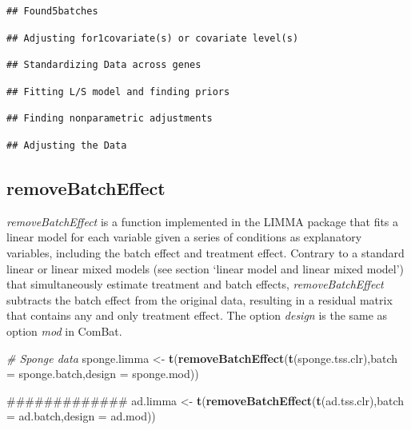 \documentclass[]{book}
\newenvironment{Shaded}{\begin{snugshade}}{\end{snugshade}}
\newcommand{\KeywordTok}[1]{\textcolor[rgb]{0.13,0.29,0.53}{\textbf{#1}}}
\newcommand{\DataTypeTok}[1]{\textcolor[rgb]{0.13,0.29,0.53}{#1}}
\newcommand{\StringTok}[1]{\textcolor[rgb]{0.31,0.60,0.02}{#1}}
\newcommand{\CommentTok}[1]{\textcolor[rgb]{0.56,0.35,0.01}{\textit{#1}}}
\newcommand{\NormalTok}[1]{#1}
\begin{document}
\begin{verbatim}
## Found5batches
\end{verbatim}

\begin{verbatim}
## Adjusting for1covariate(s) or covariate level(s)
\end{verbatim}

\begin{verbatim}
## Standardizing Data across genes
\end{verbatim}

\begin{verbatim}
## Fitting L/S model and finding priors
\end{verbatim}

\begin{verbatim}
## Finding nonparametric adjustments
\end{verbatim}

\begin{verbatim}
## Adjusting the Data
\end{verbatim}

\subsection{removeBatchEffect}\label{removebatcheffect}

\emph{removeBatchEffect} is a function implemented in the LIMMA package
that fits a linear model for each variable given a series of conditions
as explanatory variables, including the batch effect and treatment
effect. Contrary to a standard linear or linear mixed models (see
section `linear model and linear mixed model') that simultaneously
estimate treatment and batch effects, \emph{removeBatchEffect} subtracts
the batch effect from the original data, resulting in a residual matrix
that contains any and only treatment effect. The option \emph{design} is
the same as option \emph{mod} in ComBat.

\begin{Shaded}
\begin{Highlighting}[]
\CommentTok{# Sponge data}
\NormalTok{sponge.limma <-}\StringTok{ }\KeywordTok{t}\NormalTok{(}\KeywordTok{removeBatchEffect}\NormalTok{(}\KeywordTok{t}\NormalTok{(sponge.tss.clr),}\DataTypeTok{batch =}\NormalTok{ sponge.batch,}\DataTypeTok{design =}\NormalTok{ sponge.mod))}

\NormalTok{#############}
\NormalTok{ad.limma <-}\StringTok{ }\KeywordTok{t}\NormalTok{(}\KeywordTok{removeBatchEffect}\NormalTok{(}\KeywordTok{t}\NormalTok{(ad.tss.clr),}\DataTypeTok{batch =}\NormalTok{ ad.batch,}\DataTypeTok{design =}\NormalTok{ ad.mod))}
\end{Highlighting}
\end{Shaded}
\end{document}
